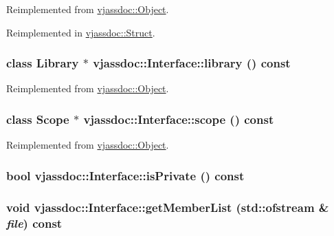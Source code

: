Reimplemented from \hyperlink{classvjassdoc_1_1Object_4e8ebbb0ce5b0bf91ec847b1e4a9f8fc}{vjassdoc::Object}.

Reimplemented in \hyperlink{classvjassdoc_1_1Struct_227d826acdbbe1702941634c90ab7e4e}{vjassdoc::Struct}.\hypertarget{classvjassdoc_1_1Interface_69ae9cd3e06f91fc2c33ebd6f1b425fe}{
\subsubsection{\setlength{\rightskip}{0pt plus 5cm}class {\bf Library} $\ast$ vjassdoc::Interface::library () const}}
\label{classvjassdoc_1_1Interface_69ae9cd3e06f91fc2c33ebd6f1b425fe}




Reimplemented from \hyperlink{classvjassdoc_1_1Object_cc4241505c5bcdd0bbcb08a1b665b3fd}{vjassdoc::Object}.\hypertarget{classvjassdoc_1_1Interface_407dbdb20eabf2e9f08bf7c459910335}{
\subsubsection{\setlength{\rightskip}{0pt plus 5cm}class {\bf Scope} $\ast$ vjassdoc::Interface::scope () const}}
\label{classvjassdoc_1_1Interface_407dbdb20eabf2e9f08bf7c459910335}




Reimplemented from \hyperlink{classvjassdoc_1_1Object_0738d05b196cc8b9e89d62839d81fc20}{vjassdoc::Object}.\hypertarget{classvjassdoc_1_1Interface_edf12e5dcbcd2ab2afb07164d4ea6e64}{
\subsubsection{\setlength{\rightskip}{0pt plus 5cm}bool vjassdoc::Interface::isPrivate () const}}
\label{classvjassdoc_1_1Interface_edf12e5dcbcd2ab2afb07164d4ea6e64}


\hypertarget{classvjassdoc_1_1Interface_ed8fce4aaef9f4fa5f3416f3adc02278}{
\subsubsection{\setlength{\rightskip}{0pt plus 5cm}void vjassdoc::Interface::getMemberList (std::ofstream \& {\em file}) const}}
\label{classvjassdoc_1_1Interface_ed8fce4aaef9f4fa5f3416f3adc02278}


